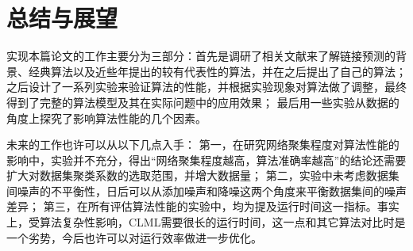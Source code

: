 \chapter{总结与展望}
实现本篇论文的工作主要分为三部分：首先是调研了相关文献来了解链接预测的背景、经典算法以及近些年提出的较有代表性的算法，并在之后提出了自己的算法；
之后设计了一系列实验来验证算法的性能，并根据实验现象对算法做了调整，最终得到了完整的算法模型及其在实际问题中的应用效果；
最后用一些实验从数据的角度上探究了影响算法性能的几个因素。


未来的工作也许可以从以下几点入手：
第一，在研究网络聚集程度对算法性能的影响中，实验并不充分，得出“网络聚集程度越高，算法准确率越高”的结论还需要扩大对数据集聚类系数的选取范围，并增大数据量；
第二，实验中未考虑数据集间噪声的不平衡性，日后可以从添加噪声和降噪这两个角度来平衡数据集间的噪声差异；
第三，在所有评估算法性能的实验中，均为提及运行时间这一指标。事实上，受算法复杂性影响，CLML需要很长的运行时间，这一点和其它算法对比时是一个劣势，今后也许可以对运行效率做进一步优化。